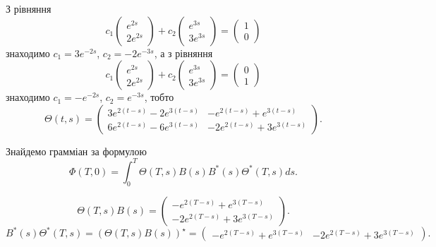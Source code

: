 \begin{solution}
    З рівняння
    \[c_1 \begin{pmatrix} e^{2s} \\ 2e^{2s} \end{pmatrix} + c_2 \begin{pmatrix} e^{3s} \\ 3e^{3s} \end{pmatrix} = \begin{pmatrix} 1 \\ 0 \end{pmatrix} \]
    знаходимо $c_1 = 3e^{-2s}$, $c_2 = -2e^{-3s}$, а з рівняння
    \[c_1 \begin{pmatrix} e^{2s} \\ 2e^{2s} \end{pmatrix} + c_2 \begin{pmatrix} e^{3s} \\ 3e^{3s} \end{pmatrix} = \begin{pmatrix} 0 \\ 1 \end{pmatrix} \]
    знаходимо $c_1 = -e^{-2s}$, $c_2 = e^{-3s}$, тобто
    \[ \Theta(t, s) = \begin{pmatrix} 3e^{2(t-s)} - 2e^{3(t-s)} & -e^{2(t-s)} + e^{3(t-s)} \\ 6e^{2(t-s)} - 6e^{3(t-s)} & -2e^{2(t-s)} + 3e^{3(t-s)} \end{pmatrix}. \]
    
    Знайдемо грамміан за формулою \[\Phi(T, 0) = \int_0^T \Theta(T, s) B(s) B^* (s) \Theta^*(T, s) ds. \]
    
    \[ \Theta(T, s) B(s) = \begin{pmatrix} -e^{2(T - s)} + e^{3(T - s)} \\ -2e^{2(T - s)} + 3e^{3(T - s)} \end{pmatrix}. \]
    \[ B^* (s) \Theta^*(T, s)  =  (\Theta(T, s) B(s))^\star = \begin{pmatrix} -e^{2(T - s)} + e^{3(T - s)} & -2e^{2(T - s)} + 3e^{3(T - s)} \end{pmatrix}. \]
    

\end{solution}
